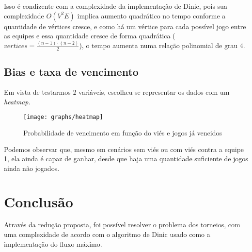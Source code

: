\documentclass[11pt]{article}
\begin{document}
Isso é condizente com a complexidade da implementação de Dinic, pois sua complexidade $O(V^2E)$ implica aumento quadrático no tempo conforme a quantidade de vértices cresce, e como há um vértice para cada possível jogo entre as equipes e essa quantidade cresce de forma quadrática ($vertices = \frac{(n - 1) \cdot (n - 2)}{2}$), o tempo aumenta numa relação polinomial de grau 4.

\subsection{Bias e taxa de vencimento}

Em vista de testarmos 2 variáveis, escolheu-se representar os dados com um \textit{heatmap}.

\begin{figure}[H]
    \centering
    \caption{Probabilidade de vencimento em função do viés e jogos já vencidos}
    \label{fig:bias_wins}
    \texttt{[image: graphs/heatmap]}
\end{figure}

Podemos observar que, mesmo em cenários sem viés ou com viés contra a equipe 1, ela ainda é capaz de ganhar, desde que haja uma quantidade suficiente de jogos ainda não jogados.

\section{Conclusão}

Através da redução proposta, foi possível resolver o problema dos torneios, com uma complexidade de acordo com o algoritmo de Dinic usado como a implementação do fluxo máximo.
\end{document}
